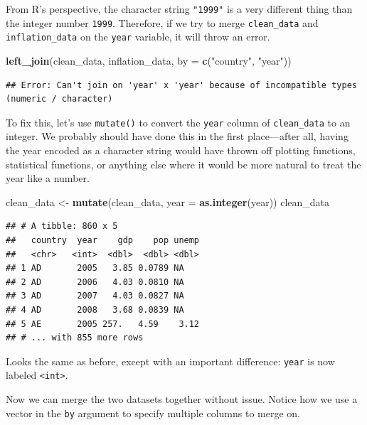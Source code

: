 \documentclass[
  12pt,
  oneside,openany]{book}
\newenvironment{Shaded}{\begin{snugshade}}{\end{snugshade}}
\newcommand{\DataTypeTok}[1]{\textcolor[rgb]{0.13,0.29,0.53}{#1}}
\newcommand{\KeywordTok}[1]{\textcolor[rgb]{0.13,0.29,0.53}{\textbf{#1}}}
\newcommand{\NormalTok}[1]{#1}
\newcommand{\StringTok}[1]{\textcolor[rgb]{0.31,0.60,0.02}{#1}}
\begin{document}
From R's perspective, the character string \texttt{"1999"} is a very different thing than the integer number \texttt{1999}. Therefore, if we try to merge \texttt{clean\_data} and \texttt{inflation\_data} on the \texttt{year} variable, it will throw an error.

\begin{Shaded}
\begin{Highlighting}[]
\KeywordTok{left\_join}\NormalTok{(clean\_data,}
\NormalTok{          inflation\_data,}
          \DataTypeTok{by =} \KeywordTok{c}\NormalTok{(}\StringTok{"country"}\NormalTok{, }\StringTok{"year"}\NormalTok{))}
\end{Highlighting}
\end{Shaded}

\begin{verbatim}
## Error: Can't join on 'year' x 'year' because of incompatible types (numeric / character)
\end{verbatim}

To fix this, let's use \texttt{mutate()} to convert the \texttt{year} column of \texttt{clean\_data} to an integer. We probably should have done this in the first place---after all, having the year encoded as a character string would have thrown off plotting functions, statistical functions, or anything else where it would be more natural to treat the year like a number.

\begin{Shaded}
\begin{Highlighting}[]
\NormalTok{clean\_data \textless{}{-}}\StringTok{ }\KeywordTok{mutate}\NormalTok{(clean\_data,}
                     \DataTypeTok{year =} \KeywordTok{as.integer}\NormalTok{(year))}
\NormalTok{clean\_data}
\end{Highlighting}
\end{Shaded}

\begin{verbatim}
## # A tibble: 860 x 5
##   country  year    gdp    pop unemp
##   <chr>   <int>  <dbl>  <dbl> <dbl>
## 1 AD       2005   3.85 0.0789 NA   
## 2 AD       2006   4.03 0.0810 NA   
## 3 AD       2007   4.03 0.0827 NA   
## 4 AD       2008   3.68 0.0839 NA   
## 5 AE       2005 257.   4.59    3.12
## # ... with 855 more rows
\end{verbatim}

Looks the same as before, except with an important difference: \texttt{year} is now labeled \texttt{\textless{}int\textgreater{}}.

Now we can merge the two datasets together without issue. Notice how we use a vector in the \texttt{by} argument to specify multiple columns to merge on.
\end{document}
